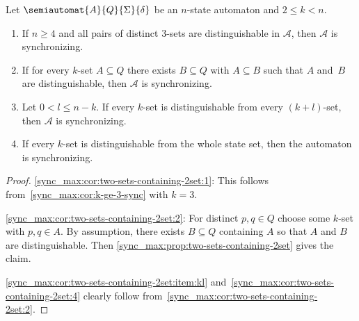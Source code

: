 \begin{corollary} \label{sync_max:cor:two-sets-containing-2set}
	Let $\semiautomat{A}{Q}{\Sigma}{\delta}$ be an $n$-state automaton and $2 \le k < n$.
	
	\begin{enumerate}
		\item \label{sync_max:cor:two-sets-containing-2set:1} If $n \ge 4$ and all pairs of distinct $3$-sets
		are distinguishable in $\mathcal A$, then $\mathcal A$ is synchronizing.
		
		
		\item \label{sync_max:cor:two-sets-containing-2set:2} If for every $k$-set $A \subseteq Q$ there exists $B \subseteq Q$
		with $A \subseteq B$ such that $A$ and~$B$ are distinguishable,
		then $\mathcal A$ is synchronizing.
		
		\item \label{sync_max:cor:two-sets-containing-2set:item:kl}  Let $0 < l \le n - k$.
		If every $k$-set is distinguishable from 
		every $(k+l)$-set, then $\mathcal A$ is synchronizing.  
		
		\item \label{sync_max:cor:two-sets-containing-2set:4} If every $k$-set is distinguishable from the whole
		state set, then the automaton is synchronizing.
	\end{enumerate}	
\end{corollary}
\begin{proof}
	\ref{sync_max:cor:two-sets-containing-2set:1}: This follows from~\cref{sync_max:cor:k-ge-3-sync} with $k = 3$.
	
	\ref{sync_max:cor:two-sets-containing-2set:2}: For distinct $p,q \in Q$ choose some $k$-set with $p, q \in A$.
	By assumption, there exists $B \subseteq Q$ containing $A$ 
	so that $A$ and $B$ are distinguishable.
	Then \cref{sync_max:prop:two-sets-containing-2set} gives the claim.
	
	\ref{sync_max:cor:two-sets-containing-2set:item:kl} and~\ref{sync_max:cor:two-sets-containing-2set:4} clearly follow from~\ref{sync_max:cor:two-sets-containing-2set:2}.
\end{proof}

